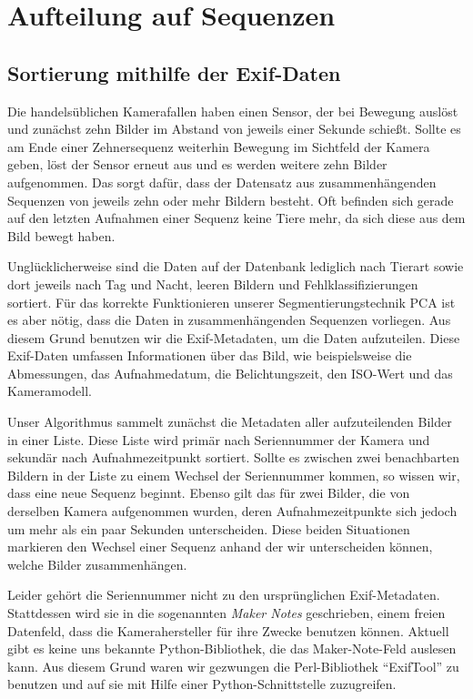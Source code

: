 \section{Aufteilung auf Sequenzen}

\subsection{Sortierung mithilfe der Exif-Daten}

Die handelsüblichen Kamerafallen haben einen Sensor, der bei Bewegung auslöst und zunächst zehn Bilder im Abstand von jeweils einer Sekunde schießt. Sollte es am Ende einer Zehnersequenz weiterhin Bewegung im Sichtfeld der Kamera geben, löst der Sensor erneut aus und es werden weitere zehn Bilder aufgenommen. Das sorgt dafür, dass der Datensatz aus zusammenhängenden Sequenzen von jeweils zehn oder mehr Bildern besteht. Oft befinden sich gerade auf den letzten Aufnahmen einer Sequenz keine Tiere mehr, da sich diese aus dem Bild bewegt haben. 

Unglücklicherweise sind die Daten auf der Datenbank lediglich nach Tierart sowie dort jeweils nach Tag und Nacht, leeren Bildern und Fehlklassifizierungen sortiert. Für das korrekte Funktionieren unserer Segmentierungstechnik PCA ist es aber nötig, dass die Daten in zusammenhängenden Sequenzen vorliegen. Aus diesem Grund benutzen wir die Exif-Metadaten, um die Daten aufzuteilen. Diese Exif-Daten umfassen Informationen über das Bild, wie beispielsweise die Abmessungen, das Aufnahmedatum, die Belichtungszeit, den ISO-Wert und das Kameramodell.

Unser Algorithmus sammelt zunächst die Metadaten aller aufzuteilenden Bilder in einer Liste. Diese Liste wird primär nach Seriennummer der Kamera und sekundär nach Aufnahmezeitpunkt sortiert. Sollte es zwischen zwei benachbarten Bildern in der Liste zu einem Wechsel der Seriennummer kommen, so wissen wir, dass eine neue Sequenz beginnt. Ebenso gilt das für zwei Bilder, die von derselben Kamera aufgenommen wurden, deren Aufnahmezeitpunkte sich jedoch um mehr als ein paar Sekunden unterscheiden. Diese beiden Situationen markieren den Wechsel einer Sequenz anhand der wir unterscheiden können, welche Bilder zusammenhängen.

Leider gehört die Seriennummer nicht zu den ursprünglichen Exif-Metadaten. Stattdessen wird sie in die sogenannten \emph{Maker Notes} geschrieben, einem freien Datenfeld, dass die Kamerahersteller für ihre Zwecke benutzen können. Aktuell gibt es keine uns bekannte Python-Bibliothek, die das Maker-Note-Feld auslesen kann. Aus diesem Grund waren wir gezwungen die Perl-Bibliothek \enquote{ExifTool} \cite{exif} zu benutzen und auf sie mit Hilfe einer Python-Schnittstelle zuzugreifen.

